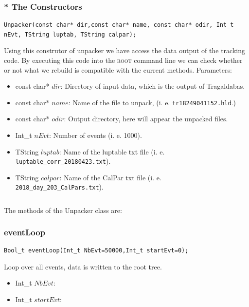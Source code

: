 \documentclass[a4paper]{book}
\begin{document}
\subsubsection{* The Constructors}

\begin{lstlisting}[style=customc]
Unpacker(const char* dir,const char* name, const char* odir, Int_t nEvt, TString luptab, TString calpar);
\end{lstlisting}

Using this construtor of unpacker we have access the data output of the tracking code. By executing this code into the \textsc{root} command line we can check whether or not what we rebuild is compatible with the current methods. Parameters:

\begin{itemize}
	\item const char* $dir$: Directory of input data, which is the output of Tragaldabas.
	\item const char* $name$: Name of the file to unpack, (i. e. \texttt{tr18249041152.hld}.)
	\item const char* $odir$: Output directory, here will appear the unpacked files.
	\item Int\_t $nEvt$: Number of events (i. e. 1000).
	\item TString $luptab$: Name of the luptable txt file (i. e. \texttt{luptable\_corr\_20180423.txt}).
	\item TString $calpar$: Name of the CalPar txt file (i. e. \texttt{2018\_day\_203\_CalPars.txt}).
\end{itemize}

\[\]

The methods of the Unpacker class are:

\subsubsection{eventLoop}

\begin{lstlisting}[style=customc]
Bool_t eventLoop(Int_t NbEvt=50000,Int_t startEvt=0);
\end{lstlisting}

Loop over all events, data is written to the root tree.

\begin{itemize}
	\item Int\_t $NbEvt$: 
	\item Int\_t $startEvt$: 
\end{itemize}
\end{document}
